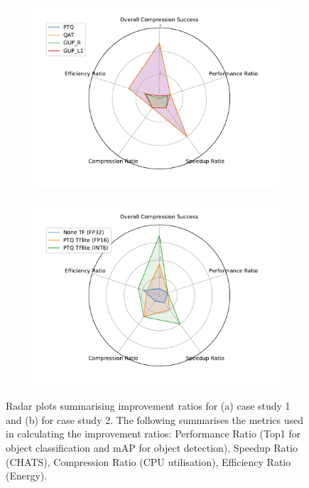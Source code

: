 \begin{figure}[]
    \centering
    \begin{subfigure}{0.49\textwidth}
        \includegraphics[width=1\textwidth]{other/figures/spider_pc_resnet18.pdf}
        \caption{}
    \end{subfigure}
    \begin{subfigure}{0.49\textwidth}
        \includegraphics[width=1\textwidth]{other/figures/spider_raspebrrypi_yolo.pdf}
        \caption{}
    \end{subfigure}
   
    \caption{Radar plots summarising improvement ratios for (a) case study 1 and (b) for case study 2. The following summarises the metrics used in calculating the improvement ratios: Performance Ratio (Top1 for object classification and mAP for object detection),  Speedup Ratio (CHATS), Compression Ratio (CPU utilisation), Efficiency Ratio (Energy).}
    \label{fig:Radar-spider}
\end{figure}




